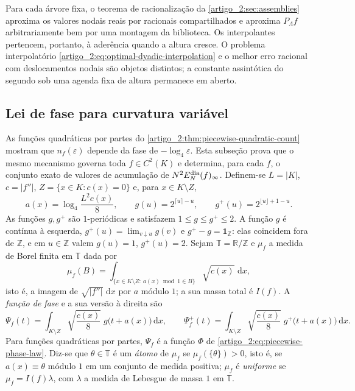 \documentclass[12pt,a4paper]{article}
\theoremstyle{preciso}
\theoremstyle{definition}
\newcommand{\dd}{\,\mathrm{d}}
\theoremstyle{preciso}
\theoremstyle{preciso}
\theoremstyle{preciso}
\theoremstyle{preciso}
\theoremstyle{definition}
\theoremstyle{preciso}
\theoremstyle{definition}
\theoremstyle{preciso}
\theoremstyle{preciso}
\theoremstyle{definition}
\begin{document}
Para cada árvore fixa, o teorema de racionalização da \cref{artigo_2:sec:assemblies}
aproxima os valores nodais reais por racionais compartilhados e aproxima
$P_\Lambda f$ arbitrariamente bem por uma montagem da biblioteca. Os
interpolantes pertencem, portanto, à aderência quando a altura cresce. O
problema interpolatório \eqref{artigo_2:eq:optimal-dyadic-interpolation} e o melhor
erro racional com deslocamentos nodais são objetos distintos; a constante
assintótica do segundo sob uma agenda fixa de altura permanece em aberto.
\subsection{Lei de fase para curvatura variável}
\label{artigo_2:sec:phase-law}

As funções quadráticas por partes do \cref{artigo_2:thm:piecewise-quadratic-count} mostram que
$n_f(\varepsilon)$ depende da fase de $-\log_4\varepsilon$. Esta subseção prova que
o mesmo mecanismo governa toda $f\in C^2(K)$ e determina, para cada $f$, o
conjunto exato de valores de acumulação de $N^2E_N^{\rm dia}(f)_\infty$.
Definem-se $L=|K|$, $c=|f''|$, $Z=\{x\in K:c(x)=0\}$ e, para $x\in K\setminus Z$,
\begin{equation}
 a(x)=\log_4\frac{L^2c(x)}{8},
 \qquad
 g(u)=2^{\lceil u\rceil-u},
 \qquad
 g^{+}(u)=2^{\lfloor u\rfloor+1-u}.
 \label{artigo_2:eq:phase-kernels}
\end{equation}
As funções $g,g^+$ são $1$-periódicas e satisfazem $1\le g\le g^+\le2$.
A função $g$ é contínua à esquerda, $g^+(u)=\lim_{v\downarrow u}g(v)$ e
$g^+-g=\mathbf 1_{\mathbb Z}$: elas coincidem fora de $\mathbb Z$, e em
$u\in\mathbb Z$ valem $g(u)=1$, $g^+(u)=2$. Sejam $\mathbb T=\mathbb R/\mathbb Z$
e $\mu_f$ a medida de Borel finita em $\mathbb T$ dada por
\[
 \mu_f(B)=\int_{\{x\in K\setminus Z:\ a(x)\bmod1\in B\}}\sqrt{c(x)}\,\dd x,
\]
isto é, a imagem de $\sqrt{|f''|}\,\dd x$ por $a$ módulo $1$; a sua massa
total é $I(f)$. A \emph{função de fase} e a sua versão à direita são
\begin{equation}
 \Psi_f(t)=\int_{K\setminus Z}\sqrt{\frac{c(x)}8}\;g\bigl(t+a(x)\bigr)\dd x,
 \qquad
 \Psi_f^{+}(t)=\int_{K\setminus Z}\sqrt{\frac{c(x)}8}\;g^{+}\bigl(t+a(x)\bigr)\dd x.
 \label{artigo_2:eq:phase-function}
\end{equation}
Para funções quadráticas por partes, $\Psi_f$ é a função $\Phi$ de
\eqref{artigo_2:eq:piecewise-phase-law}. Diz-se que $\theta\in\mathbb T$ é um
\emph{átomo} de $\mu_f$ se $\mu_f(\{\theta\})>0$, isto é, se $a(x)\equiv\theta$
módulo $1$ em um conjunto de medida positiva; $\mu_f$ é \emph{uniforme} se
$\mu_f=I(f)\lambda$, com $\lambda$ a medida de Lebesgue de massa $1$ em $\mathbb T$.
\end{document}
